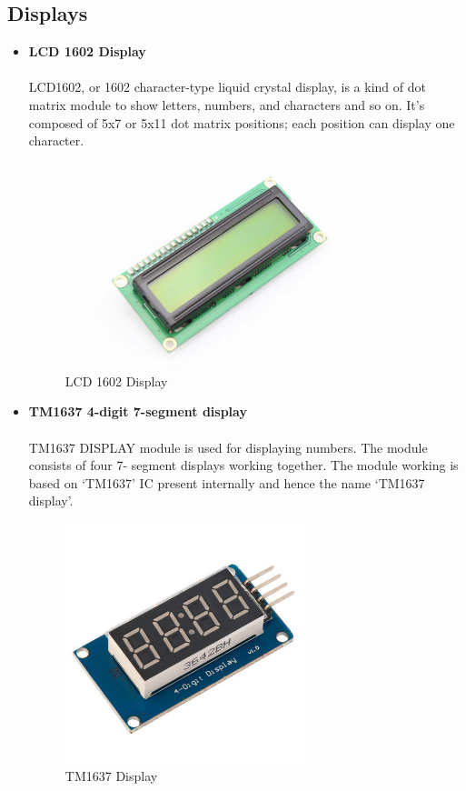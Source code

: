 \newpage

\subsection{Displays}

\begin{itemize}[wide, labelwidth=!, labelindent=0pt]
    \item \textbf{LCD 1602 Display}
    \vspace{-0.5cm}
    \paragraph{}LCD1602, or 1602 character-type liquid crystal display, is a kind of dot matrix module to show letters, numbers, and characters and so on. It's composed of 5x7 or 5x11 dot matrix positions; each position can display one character.
    \begin{figure}[H]
    \centering
    \includegraphics[width = 9cm]{project/images/lcd1602.jpg}
    \caption{LCD 1602 Display}
    \end{figure}
    
    \item \textbf{TM1637 4-digit 7-segment display}
    \vspace{-0.5cm}
    \paragraph{}TM1637 DISPLAY module is used for displaying numbers. The module consists of four 7- segment displays working together. The module working is based on ‘TM1637’ IC present internally and hence the name ‘TM1637 display’.
    \begin{figure}[H]
    \centering
    \includegraphics[width = 7cm]{project/images/tm1637.jpg}
    \caption{TM1637 Display}
    \end{figure}

\end{itemize}

